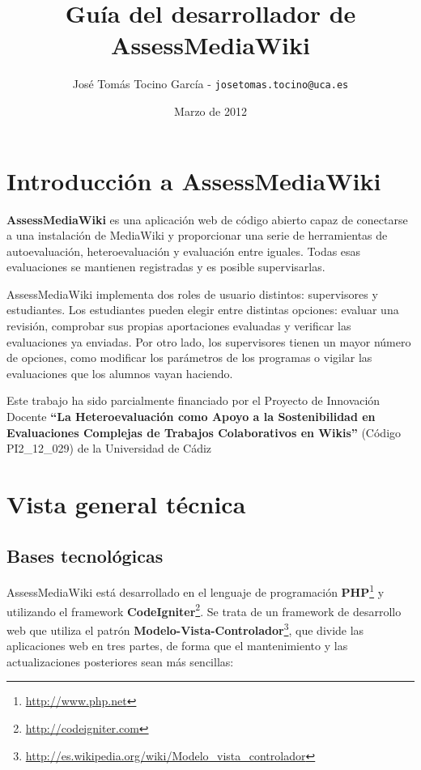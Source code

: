 \documentclass[11pt]{article}
\title{Guía del desarrollador de AssessMediaWiki}
\author{José Tomás Tocino García - \texttt{josetomas.tocino@uca.es}}
\date{Marzo de 2012}
\begin{document}
\begin{titlepage}
\maketitle  
\end{titlepage}

\section{Introducción a AssessMediaWiki}

\textbf{AssessMediaWiki} es una aplicación web de código abierto capaz de
conectarse a una instalación de MediaWiki y proporcionar una serie de
herramientas de autoevaluación, heteroevaluación y evaluación entre
iguales. Todas esas evaluaciones se mantienen registradas y es posible
supervisarlas. 

AssessMediaWiki implementa dos roles de usuario distintos: supervisores y
estudiantes. Los estudiantes pueden elegir entre distintas opciones: evaluar una
revisión, comprobar sus propias aportaciones evaluadas y verificar las
evaluaciones ya enviadas. Por otro lado, los supervisores tienen un mayor número
de opciones, como modificar los parámetros de los programas o vigilar las
evaluaciones que los alumnos vayan haciendo.

Este trabajo ha sido parcialmente financiado por el Proyecto de Innovación
Docente \textbf{``La Heteroevaluación como Apoyo a la Sostenibilidad en Evaluaciones
Complejas de Trabajos Colaborativos en Wikis''} (Código PI2\_12\_029) de la
Universidad de Cádiz

\section{Vista general técnica}

\subsection{Bases tecnológicas}

AssessMediaWiki está desarrollado en el lenguaje de programación
\textbf{PHP}\footnote{\url{http://www.php.net}} y utilizando el framework
\textbf{CodeIgniter}\footnote{\url{http://codeigniter.com}}. Se trata de un
framework de desarrollo web que utiliza el patrón
\textbf{Modelo-Vista-Controlador}\footnote{\url{http://es.wikipedia.org/wiki/Modelo_vista_controlador}},
que divide las aplicaciones web en tres partes, de forma que el mantenimiento y
las actualizaciones posteriores sean más sencillas:
\end{document}
